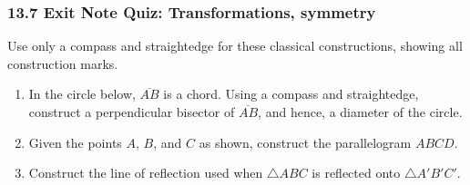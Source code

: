\documentclass[12pt, twoside]{article}
\begin{document}
\subsubsection*{13.7 Exit Note Quiz: Transformations, symmetry}
Use only a compass and straightedge for these classical constructions, showing all construction marks.
 \begin{enumerate}

  \item In the circle below, $\overline{AB}$ is a chord. Using a compass and straightedge, construct a perpendicular bisector of $\overline{AB}$, and hence, a diameter of the circle. \vspace{2cm}
    \begin{center}
    \end{center} \vspace{1cm}

  \item Given the points $A$, $B$, and $C$ as shown, construct the parallelogram $ABCD$.
    \vspace{3cm}
   \begin{center}
   \end{center}

\newpage
  \item Construct the line of reflection used when $\triangle ABC$ is reflected onto $\triangle A'B'C'$.\vspace{0.5cm}
     \begin{center}
   \end{center} \vspace{1cm}


\end{enumerate}
\end{document}

